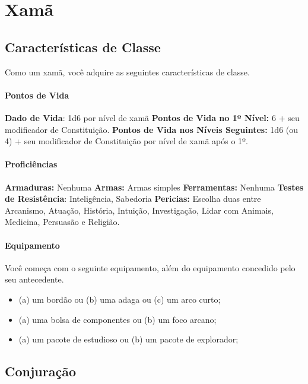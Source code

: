 \chapter{Xamã}%
\label{cha:xama}
\begin{multicols}{2}

\section*{Características de Classe}%

Como um xamã, você adquire as seguintes características de classe.

\subsubsection{Pontos de Vida}%

\noindent\textbf{Dado de Vida}: 1d6 por nível de xamã \nl
\textbf{Pontos de Vida no 1º Nível:} 6 + seu modificador de Constituição. \nl
\textbf{Pontos de Vida nos Níveis Seguintes:} 1d6 (ou 4) + seu modificador de
Constituição por nível de xamã após o 1º.

\subsubsection{Proficiências}%

\noindent\textbf{Armaduras:} Nenhuma \nl
\textbf{Armas:} Armas simples \nl
\textbf{Ferramentas:} Nenhuma \jump
\textbf{Testes de Resistência}: Inteligência, Sabedoria \nl
\textbf{Pericias:} Escolha duas entre Arcanismo, Atuação, História, Intuição,
Investigação, Lidar com Animais, Medicina, Persuasão e Religião.

\subsubsection{Equipamento}%

Você começa com o seguinte equipamento, além do equipamento concedido pelo seu
antecedente.
\begin{itemize}
    \item (a) um bordão ou (b) uma adaga ou (c) um arco curto;
    \item (a) uma bolsa de componentes ou (b) um foco arcano;
    \item (a) um pacote de estudioso ou (b) um pacote de explorador;
\end{itemize}

\section*{Conjuração}%


\end{multicols}
